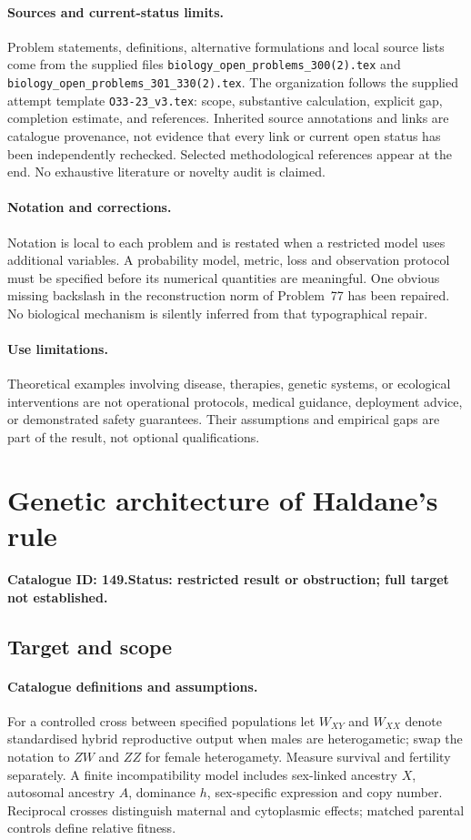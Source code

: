 \documentclass[11pt]{article}
\begin{document}
\paragraph{Sources and current-status limits.}
Problem statements, definitions, alternative formulations and local source lists
come from the supplied files
\texttt{biology\_open\_problems\_300(2).tex} and
\texttt{biology\_open\_problems\_301\_330(2).tex}.
The organization follows the supplied attempt template
\texttt{O33-23\_v3.tex}: scope, substantive calculation, explicit gap,
completion estimate, and references. Inherited source annotations and links are
catalogue provenance, not evidence that every link or current open status has
been independently rechecked. Selected methodological references appear at the
end. No exhaustive literature or novelty audit is claimed.

\paragraph{Notation and corrections.}
Notation is local to each problem and is restated when a restricted model uses
additional variables. A probability model, metric, loss and observation protocol
must be specified before its numerical quantities are meaningful. One obvious
missing backslash in the reconstruction norm of Problem~77 has been repaired.
No biological mechanism is silently inferred from that typographical repair.

\paragraph{Use limitations.}
Theoretical examples involving disease, therapies, genetic systems, or ecological
interventions are not operational protocols, medical guidance, deployment advice,
or demonstrated safety guarantees. Their assumptions and empirical gaps are part
of the result, not optional qualifications.

\setcounter{section}{148}
\section{Genetic architecture of Haldane's rule}
\label{prob:149}
\noindent\textbf{Catalogue ID: 149.}\quad \textbf{Status: restricted result or obstruction; full target not established.}
\subsection{Target and scope}
\paragraph{Catalogue definitions and assumptions.}
For a controlled cross between specified populations let $W_{XY}$ and $W_{XX}$ denote standardised hybrid reproductive output when males are heterogametic; swap the notation to $ZW$ and $ZZ$ for female heterogamety. Measure survival and fertility separately. A finite incompatibility model includes sex-linked ancestry $X$, autosomal ancestry $A$, dominance $h$, sex-specific expression and copy number. Reciprocal crosses distinguish maternal and cytoplasmic effects; matched parental controls define relative fitness.
\end{document}
